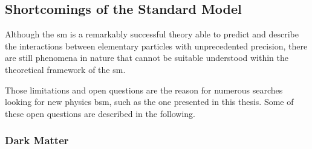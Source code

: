 

\subsection{Shortcomings of the Standard Model}

Although the \gls{sm} is a remarkably successful theory able to predict and describe the interactions between elementary particles with unprecedented precision, there are still phenomena in nature that cannot be suitable understood within the theoretical framework of the \gls{sm}. 

Those limitations and open questions are the reason for numerous searches looking for new physics \gls{bsm}, such as the one presented in this thesis. Some of these open questions are described in the following. 

\subsubsection{Dark Matter}

